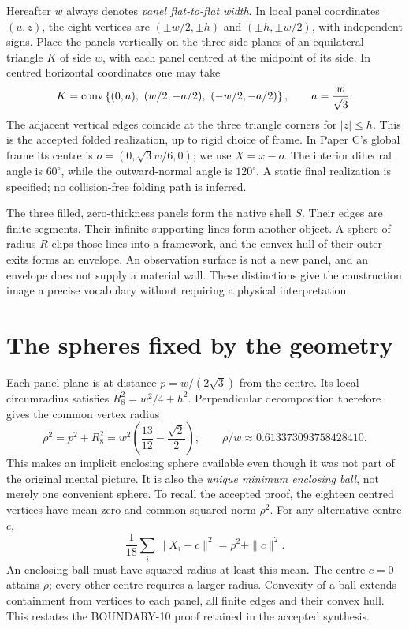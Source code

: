 \documentclass[11pt,a4paper]{article}
\begin{document}
Hereafter $w$ always denotes \emph{panel flat-to-flat width}. In local panel coordinates $(u,z)$, the eight vertices are $(\pm w/2,\pm h)$ and $(\pm h,\pm w/2)$, with independent signs. Place the panels vertically on the three side planes of an equilateral triangle $K$ of side $w$, with each panel centred at the midpoint of its side. In centred horizontal coordinates one may take
\begin{equation}\label{eq:triangle}
K=\operatorname{conv}\left\{(0,a),\ (w/2,-a/2),\ (-w/2,-a/2)\right\},
\qquad a=\frac{w}{\sqrt3}.
\end{equation}
The adjacent vertical edges coincide at the three triangle corners for $|z|\leq h$. This is the accepted folded realization, up to rigid choice of frame. In Paper C's global frame its centre is $o=(0,\sqrt3w/6,0)$; we use $X=x-o$. The interior dihedral angle is $60^\circ$, while the outward-normal angle is $120^\circ$. A static final realization is specified; no collision-free folding path is inferred.~\cite[Secs.~2--5, 7]{PC}~\cite[Sec.~2]{SP}

The three filled, zero-thickness panels form the native shell $S$. Their edges are finite segments. Their infinite supporting lines form another object. A sphere of radius $R$ clips those lines into a framework, and the convex hull of their outer exits forms an envelope. An observation surface is not a new panel, and an envelope does not supply a material wall. These distinctions give the construction image a precise vocabulary without requiring a physical interpretation.

\section{The spheres fixed by the geometry}
Each panel plane is at distance $p=w/(2\sqrt3)$ from the centre. Its local circumradius satisfies $R_8^2=w^2/4+h^2$. Perpendicular decomposition therefore gives the common vertex radius
\begin{equation}\label{eq:rho}
\rho^2=p^2+R_8^2
=w^2\left(\frac{13}{12}-\frac{\sqrt2}{2}\right),
\qquad \rho/w\approx0.613373093758428410 .
\end{equation}
This makes an implicit enclosing sphere available even though it was not part of the original mental picture. It is also the \emph{unique minimum enclosing ball}, not merely one convenient sphere. To recall the accepted proof, the eighteen centred vertices have mean zero and common squared norm $\rho^2$. For any alternative centre $c$,
\begin{equation}\label{eq:minball}
\frac1{18}\sum_i\|X_i-c\|^2=\rho^2+\|c\|^2.
\end{equation}
An enclosing ball must have squared radius at least this mean. The centre $c=0$ attains $\rho$; every other centre requires a larger radius. Convexity of a ball extends containment from vertices to each panel, all finite edges and their convex hull. This restates the BOUNDARY-10 proof retained in the accepted synthesis.~\cite[Sec.~3]{SP}
\end{document}
